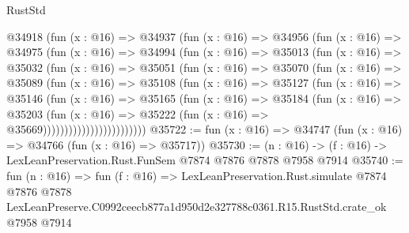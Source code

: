 \begin{lexlean}{RustStd}
\begin{coremodule}
                @34918
                  (fun (x : @16) =>
                  @34937
                    (fun (x : @16) =>
                    @34956
                      (fun (x : @16) =>
                      @34975
                        (fun (x : @16) =>
                        @34994
                          (fun (x : @16) =>
                          @35013
                            (fun (x : @16) =>
                            @35032
                              (fun (x : @16) =>
                              @35051
                                (fun (x : @16) =>
                                @35070
                                  (fun (x : @16) =>
                                  @35089
                                    (fun (x : @16) =>
                                    @35108
                                      (fun (x : @16) =>
                                      @35127
                                        (fun (x : @16) =>
                                        @35146
                                          (fun (x : @16) =>
                                          @35165
                                            (fun (x : @16) =>
                                            @35184
                                              (fun (x : @16) =>
                                              @35203
                                                (fun (x : @16) =>
                                                @35222
                                                  (fun (x : @16) => @35669))))))))))))))))))))))))
@35722 := fun (x : @16) => @34747 (fun (x : @16) => @34766 (fun (x : @16) => @35717))
@35730 := (n : @16) -> (f : @16) -> LexLeanPreservation.Rust.FunSem @7874 @7876 @7878 @7958 @7914
@35740 := fun (n : @16) =>
  fun (f : @16) =>
  LexLeanPreservation.Rust.simulate
    @7874
    @7876
    @7878
    LexLeanPreserve.C0992ceecb877a1d950d2e327788c0361.R15.RustStd.crate_ok
    @7958
    @7914
\end{coremodule}
\end{lexlean}
